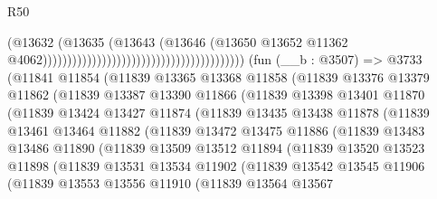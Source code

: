 \begin{lexlean}{R50}
\begin{coremodule}
                                                                            (@13632
                                                                              (@13635
                                                                                (@13643
                                                                                  (@13646
                                                                                    (@13650
                                                                                      @13652
                                                                                      @11362
                                                                                      @4062)))))))))))))))))))))))))))))))))))))))))
    (fun (__b : @3507) =>
    @3733
      (@11841
        @11854
        (@11839
          @13365
          @13368
          @11858
          (@11839
            @13376
            @13379
            @11862
            (@11839
              @13387
              @13390
              @11866
              (@11839
                @13398
                @13401
                @11870
                (@11839
                  @13424
                  @13427
                  @11874
                  (@11839
                    @13435
                    @13438
                    @11878
                    (@11839
                      @13461
                      @13464
                      @11882
                      (@11839
                        @13472
                        @13475
                        @11886
                        (@11839
                          @13483
                          @13486
                          @11890
                          (@11839
                            @13509
                            @13512
                            @11894
                            (@11839
                              @13520
                              @13523
                              @11898
                              (@11839
                                @13531
                                @13534
                                @11902
                                (@11839
                                  @13542
                                  @13545
                                  @11906
                                  (@11839
                                    @13553
                                    @13556
                                    @11910
                                    (@11839
                                      @13564
                                      @13567

\end{coremodule}
\end{lexlean}
